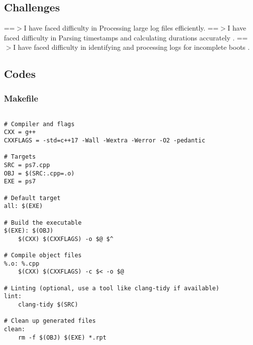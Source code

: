 \documentclass[12pt]{article}
\begin{document}
\subsection{Challenges}
==$>$I have faced difficulty in Processing large log files efficiently.
\newline
==$>$I have faced difficulty in Parsing timestamps and calculating durations accurately .
\newline
==$>$I have faced difficulty in identifying and processing logs for incomplete boots .
\subsection{Codes}

\subsubsection{Makefile}
\begin{lstlisting}[style=cppcode]

# Compiler and flags
CXX = g++
CXXFLAGS = -std=c++17 -Wall -Wextra -Werror -O2 -pedantic

# Targets
SRC = ps7.cpp
OBJ = $(SRC:.cpp=.o)
EXE = ps7

# Default target
all: $(EXE)

# Build the executable
$(EXE): $(OBJ)
	$(CXX) $(CXXFLAGS) -o $@ $^

# Compile object files
%.o: %.cpp
	$(CXX) $(CXXFLAGS) -c $< -o $@

# Linting (optional, use a tool like clang-tidy if available)
lint:
	clang-tidy $(SRC)

# Clean up generated files
clean:
	rm -f $(OBJ) $(EXE) *.rpt
\end{lstlisting}
\end{document}
